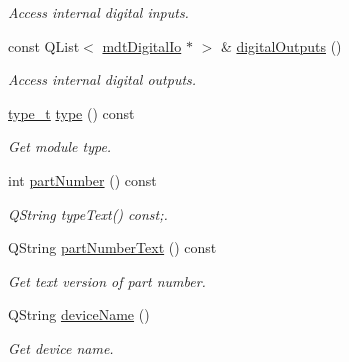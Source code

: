 \begin{DoxyCompactItemize}
\begin{DoxyCompactList}\small\item\em Access internal digital inputs. \end{DoxyCompactList}\item 
\hypertarget{classmdt_device_modbus_wago_module_a9d249d400b5e7f54e8fa7e0cc370eda2}{
const QList$<$ \hyperlink{classmdt_digital_io}{mdtDigitalIo} $\ast$ $>$ \& \hyperlink{classmdt_device_modbus_wago_module_a9d249d400b5e7f54e8fa7e0cc370eda2}{digitalOutputs} ()}
\label{classmdt_device_modbus_wago_module_a9d249d400b5e7f54e8fa7e0cc370eda2}

\begin{DoxyCompactList}\small\item\em Access internal digital outputs. \end{DoxyCompactList}\item 
\hypertarget{classmdt_device_modbus_wago_module_a32a3ee554941240682fb1b166c1217ff}{
\hyperlink{classmdt_device_modbus_wago_module_a2d8f6895b2a031c953bd91c2f65a1a25}{type\_\-t} \hyperlink{classmdt_device_modbus_wago_module_a32a3ee554941240682fb1b166c1217ff}{type} () const }
\label{classmdt_device_modbus_wago_module_a32a3ee554941240682fb1b166c1217ff}

\begin{DoxyCompactList}\small\item\em Get module type. \end{DoxyCompactList}\item 
int \hyperlink{classmdt_device_modbus_wago_module_ab694800ebccf308beb9eeb9a789b0442}{partNumber} () const 
\begin{DoxyCompactList}\small\item\em QString typeText() const;. \end{DoxyCompactList}\item 
QString \hyperlink{classmdt_device_modbus_wago_module_acac6ca0c286f50adbd62d055339131f9}{partNumberText} () const 
\begin{DoxyCompactList}\small\item\em Get text version of part number. \end{DoxyCompactList}\item 
\hypertarget{classmdt_device_modbus_wago_module_ac67ae134628f958027965933d14cb30b}{
QString \hyperlink{classmdt_device_modbus_wago_module_ac67ae134628f958027965933d14cb30b}{deviceName} ()}
\label{classmdt_device_modbus_wago_module_ac67ae134628f958027965933d14cb30b}

\begin{DoxyCompactList}\small\item\em Get device name. \end{DoxyCompactList}\end{DoxyCompactItemize}
